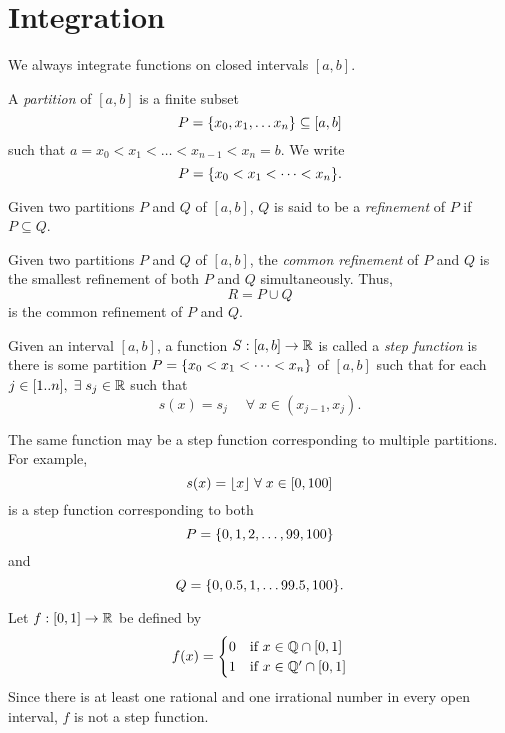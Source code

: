 
\section{Integration}
We always integrate functions on closed intervals $[a, b]$.

\begin{defn}[Partition] \label{defn:partition}
    A \emph{partition} of $[a, b]$ is a finite subset \[
        P = \set{x_{0}, x_{1}, \dots x_{n}} \subseteq [a, b]
    \] such that $a = x_{0} < x_{1} < \dots < x_{n-1} < x_{n} = b$.
    We write \[
        P = \set{x_{0} < x_{1} < \dots < x_{n}}.
    \]
\end{defn}

\begin{defn}[Refinement] \label{defn:refinement}
    Given two partitions $P$ and $Q$ of $[a, b]$, $Q$ is said to be a \emph{refinement} of $P$ if $P \subseteq Q$.
    
\end{defn}

\begin{defn} \label{defn:common refinement}
    Given two partitions $P$ and $Q$ of $[a, b]$, the \emph{common refinement} of $P$ and $Q$ is the smallest refinement of both $P$ and $Q$ simultaneously. Thus, \[
        R = P \cup Q
    \] is the common refinement of $P$ and $Q$.
\end{defn}

\begin{defn} \label{defn:step fn}
    Given an interval $[a, b]$, a function $S : [a, b] \to \mathbb{R}$ is called a \emph{step function} is there is some partition $P = \set{x_{0} < x_{1} < \dots < x_{n}}$ of $[a, b]$ such that for each $j \in [1 .. n], \;\exists\; s_{j} \in \mathbb{R}$ such that \[
        s(x) = s_{j} \quad \;\forall\; x \in (x_{j-1}, x_{j}).
    \]
\end{defn}
\begin{rem}
    The same function may be a step function corresponding to multiple partitions. For example, \[
        s(x) = \floor{x} \;\forall\; x \in [0, 100]
    \] is a step function corresponding to both \[
        P = \set{0, 1, 2, \dots, 99, 100}
    \] and \[
        Q = \set{0, 0.5, 1, \dots 99.5, 100}.
    \]
\end{rem}

\begin{example}
    Let $f : [0, 1] \to \mathbb{R}$ be defined by \[
        f(x) = \begin{cases}
            0 & \text{if } x \in \mathbb{Q} \cap [0, 1] \\
            1 & \text{if } x \in \mathbb{Q}' \cap [0, 1]
        \end{cases}
    \] Since there is at least one rational and one irrational number in every open interval, $f$ is not a step function.
\end{example}


